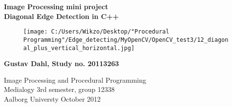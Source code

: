 \thispagestyle{empty} %
\hspace{6cm} \vspace{6cm}
\begin{center}
\textbf{\Huge {Image Processing mini project}\\ \vspace{1cm}
\huge{Diagonal Edge Detection in C++}}

\begin{figure} [H]
\texttt{[image: C:/Users/Wikzo/Desktop/"Procedural Programming"/Edge\_detecting/MyOpenCV/OpenCV\_test3/12\_diagonal\_plus\_vertical\_horizontal.jpg]}
\centering
\label{building_diagonal_edge}
\end{figure}
\end{center}

\begin{center}
\Large{\textbf{Gustav Dahl, Study no. 20113263}}
\end{center}
\vfill
Image Processing and Procedural Programming\\
Medialogy 3rd semester, group 12338\\
Aalborg Universty October 2012\\
\thispagestyle{empty}
\setcounter{page}{0}